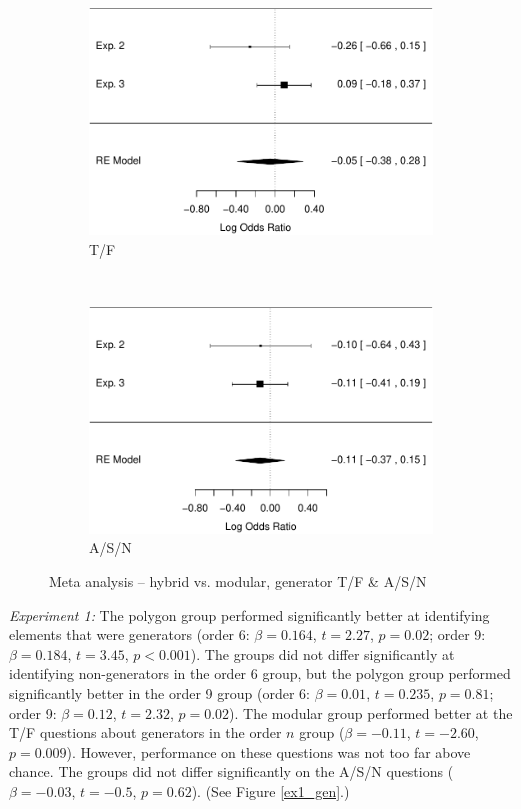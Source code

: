 \documentclass[man,10pt]{apa6}
\begin{document}
\begin{figure}
\centering
\begin{subfigure}[c]{0.4\textwidth}
\centering
\includegraphics[width=\textwidth]{figures/meta/question_typegenerator_TF_n_conditionhybrid.pdf}
\caption{T/F}
\end{subfigure}
~
\begin{subfigure}[c]{0.4\textwidth}
\centering
\includegraphics[width=\textwidth]{figures/meta/question_typegenerator_ASN_n_conditionhybrid.pdf}
\caption{A/S/N}
\end{subfigure}
\caption{Meta analysis -- hybrid vs. modular, generator T/F \& A/S/N}
\label{meta_genTF_h}
\end{figure}\noindent 
\textit{Experiment 1:} The polygon group performed significantly better at identifying elements that were generators (order 6: $\beta = 0.164$, $t = 2.27$, $p = 0.02$; order 9: $\beta = 0.184$, $t = 3.45$, $p < 0.001$). The groups did not differ significantly at identifying non-generators in the order 6 group, but the polygon group performed significantly better in the order 9 group (order 6: $\beta = 0.01$, $t = 0.235$, $p = 0.81$; order 9: $\beta = 0.12$, $t = 2.32$, $p = 0.02$). The modular group performed better at the T/F questions about generators in the order $n$ group ($\beta = -0.11$, $t = -2.60$, $p = 0.009$). However, performance on these questions was not too far above chance. The groups did not differ significantly on the A/S/N questions ($\beta = -0.03$, $t = -0.5$, $p = 0.62$). (See Figure \ref{ex1_gen}.)\par
\end{document}
